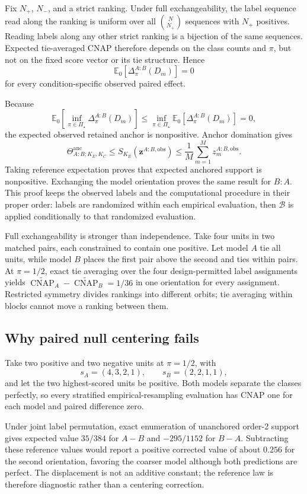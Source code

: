 \documentclass[11pt]{article}
\newcommand{\CNAP}{\operatorname{CNAP}}
\newcommand{\PSet}{\Pi_\star}
\newcommand{\Boot}{\mathcal{B}}
\newcommand{\E}{\mathbb{E}}
\newcommand{\CNAPta}{\widetilde{\CNAP}}
\newcommand{\Thetaanc}{\Theta^{\mathrm{anc}}}
\theoremstyle{remark}
\begin{document}
Fix $N_+$, $N_-$, and a strict ranking. Under full exchangeability, the label
sequence read along the ranking is uniform over all $\binom N{N_+}$ sequences
with $N_+$ positives. Reading labels along any other strict ranking is a
bijection of the same sequences. Expected tie-averaged CNAP therefore depends
on the class counts and $\pi$, but not on the fixed score vector or its tie
structure. Hence
\begin{equation}
\E_0[\Delta^{A:B}_\pi(D_m)]=0
\label{eq:reference-cell}
\end{equation}
for every condition-specific observed paired effect.

Because
\[
\E_0\!\left[
\inf_{\pi\in\PSet}\Delta^{A:B}_\pi(D_m)
\right]
\leq
\inf_{\pi\in\PSet}
\E_0[\Delta^{A:B}_\pi(D_m)]
=0,
\]
the expected observed retained anchor is nonpositive. Anchor domination gives
\[
\Thetaanc_{A:B;K_E,K_C}
\leq
S_{K_E}(\mathbf z^{A:B,\mathrm{obs}})
\leq
\frac1M\sum_{m=1}^Mz_m^{A:B,\mathrm{obs}}.
\]
Taking reference expectation proves that expected anchored support is
nonpositive. Exchanging the model orientation proves the same result for
$B:A$. This proof keeps the observed labels and the computational procedure in
their proper order: labels are randomized within each empirical evaluation,
then $\Boot$ is applied conditionally to that randomized evaluation.

Full exchangeability is stronger than independence. Take four units in two
matched pairs, each constrained to contain one positive. Let model $A$ tie all
units, while model $B$ places the first pair above the second and ties within
pairs. At $\pi=1/2$, exact tie averaging over the four design-permitted label
assignments yields $\CNAPta_A-\CNAPta_B=1/36$ in one orientation for every
assignment. Restricted symmetry divides rankings into different orbits; tie
averaging within blocks cannot move a ranking between them.

\subsection{Why paired null centering fails}

Take two positive and two negative units at $\pi=1/2$, with
\[
s_A=(4,3,2,1),
\qquad
s_B=(2,2,1,1),
\]
and let the two highest-scored units be positive. Both models separate the
classes perfectly, so every stratified empirical-resampling evaluation has
CNAP one for each model and paired difference zero.

Under joint label permutation, exact enumeration of unanchored order-2 support
gives expected value $35/384$ for $A-B$ and $-295/1152$ for $B-A$.
Subtracting these reference values would report a positive corrected value of
about $0.256$ for the second orientation, favoring the coarser model although
both predictions are perfect. The displacement is not an additive constant;
the reference law is therefore diagnostic rather than a centering correction.
\end{document}
